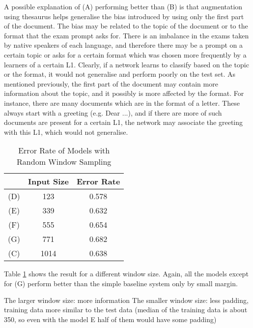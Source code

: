 A possible explanation of (A) performing better than (B) is that augmentation using thesaurus helps generalise the bias introduced by using only the first part of the document.
The bias may be related to the topic of the document or to the format that the exam prompt asks for.
There is an imbalance in the exams taken by native speakers of each language, and therefore there may be a prompt on a certain topic or asks for a certain format which was chosen more frequently by a learners of a certain L1. 
Clearly, if a network learns to classify based on the topic or the format, it would not generalise and perform poorly on the test set.
As mentioned previously, the first part of the document may contain more information about the topic, and it possibly is more affected by the format.
For instance, there are many documents which are in the format of a letter.
These always start with a greeting (e.g. Dear ...), and if there are more of such documents are present for a certain L1, the network may associate the greeting with this L1, which would not generalise.

\begin{table}[]
\centering
\caption{Error Rate of Models with Random Window Sampling}
\label{tab:r_w_s}
\begin{tabular}{ccc}
&Input Size & Error Rate \\ \hline
(D)&123        & 0.578      \\
(E)&339        & 0.632      \\
(F)&555        & 0.654      \\
(G)&771        & 0.682      \\
(C)&1014       & \color{red}0.638\color{black}    
\end{tabular}
\end{table}
Table \ref{tab:r_w_s} shows the result for a different window size.
Again, all the models except for (G) perform better than the simple baseline system only by small margin.


The larger window size:  more information
The smaller window size: less padding, training data more similar to the test data (median of the training data is about 350, so even with the model E half of them would have some padding) 